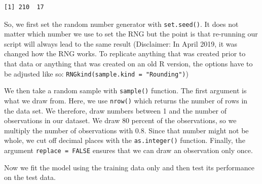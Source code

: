 \documentclass[]{article}
\begin{document}
\begin{verbatim}
[1] 210  17
\end{verbatim}

So, we first set the random number generator with \texttt{set.seed()}. It does not matter which number we use to set the RNG but the point is that re-running our script will always lead to the same result (Disclaimer: In April 2019, it was changed how the RNG works. To replicate anything that was created prior to that data or anything that was created on an old R version, the options have to be adjusted like so: \texttt{RNGkind(sample.kind\ =\ "Rounding")})

We then take a random sample with \texttt{sample()} function. The first argument is what we draw from. Here, we use \texttt{nrow()} which returns the number of rows in the data set. We therefore, draw numbers between 1 and the number of observations in our dataset. We draw 80 percent of the observations, so we multiply the number of observations with 0.8. Since that number might not be whole, we cut off decimal places with the \texttt{as.integer()} function. Finally, the argument \texttt{replace\ =\ FALSE} ensures that we can draw an observation only once.

Now we fit the model using the training data only and then test its performance on the test data.
\end{document}
